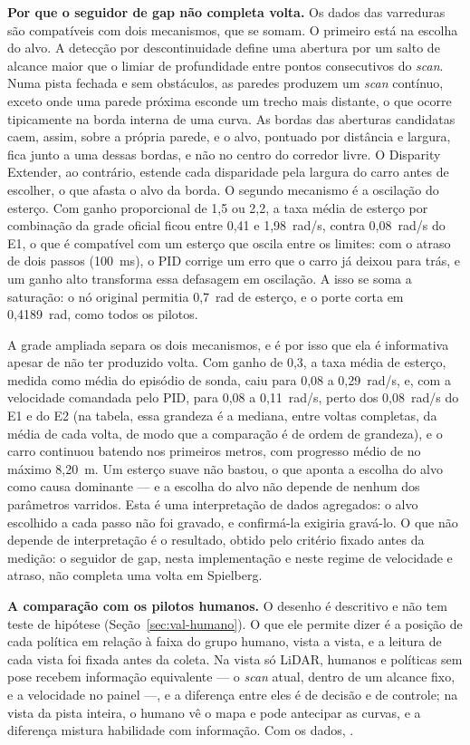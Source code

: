 \textbf{Por que o seguidor de gap não completa volta.} Os dados das varreduras
são compatíveis com dois mecanismos, que se somam. O primeiro está na escolha do
alvo. A detecção por descontinuidade define uma abertura por um salto de alcance
maior que o limiar de profundidade entre pontos consecutivos do \textit{scan}.
Numa pista fechada e sem obstáculos, as paredes produzem um \textit{scan}
contínuo, exceto onde uma parede próxima esconde um trecho mais distante, o que
ocorre tipicamente na borda interna de uma curva. As bordas das aberturas
candidatas caem, assim, sobre a própria parede, e o alvo, pontuado por distância e
largura, fica junto a uma dessas bordas, e não no centro do corredor livre. O
Disparity Extender, ao contrário, estende cada disparidade pela largura do carro
antes de escolher, o que afasta o alvo da borda. O segundo mecanismo é a
oscilação do esterço. Com ganho proporcional de 1,5 ou 2,2, a taxa média de
esterço por combinação da grade oficial ficou entre 0,41 e 1,98~rad/s, contra
0,08~rad/s do E1, o que é compatível com um esterço que oscila entre os limites:
com o atraso de dois passos (100~ms), o PID corrige um erro que o carro já deixou
para trás, e um ganho alto transforma essa defasagem em oscilação. A isso se soma
a saturação: o nó original permitia 0,7~rad de esterço, e o porte corta em
0,4189~rad, como todos os pilotos.

A grade ampliada separa os dois mecanismos, e é por isso que ela é informativa
apesar de não ter produzido volta. Com ganho de 0,3, a taxa média de esterço,
medida como média do episódio de sonda, caiu para 0,08 a 0,29~rad/s, e, com a
velocidade comandada pelo PID, para 0,08 a 0,11~rad/s, perto dos 0,08~rad/s do E1
e do E2 (na tabela, essa grandeza é a mediana, entre voltas completas, da média
de cada volta, de modo que a comparação é de ordem de grandeza), e o carro
continuou batendo
nos primeiros metros, com progresso médio de no máximo 8,20~m. Um esterço suave
não bastou, o que aponta a escolha do alvo como causa dominante --- e a escolha do
alvo não depende de nenhum dos parâmetros varridos. Esta é uma interpretação de
dados agregados: o alvo escolhido a cada passo não foi gravado, e confirmá-la
exigiria gravá-lo. O que não depende de interpretação é o resultado, obtido pelo
critério fixado antes da medição: o seguidor de gap, nesta implementação e neste
regime de velocidade e atraso, não completa uma volta em Spielberg.

\textbf{A comparação com os pilotos humanos.} O desenho é descritivo e não tem
teste de hipótese (Seção~\ref{sec:val-humano}). O que ele permite dizer é a
posição de cada política em relação à faixa do grupo humano, vista a vista, e a
leitura de cada vista foi fixada antes da coleta. Na vista só LiDAR, humanos e
políticas sem pose recebem informação equivalente --- o \textit{scan} atual,
dentro de um alcance fixo, e a velocidade no painel ---, e a diferença entre eles é de
decisão e de controle; na vista da pista inteira, o humano vê o mapa e pode
antecipar as curvas, e a diferença mistura habilidade com informação. Com os
dados, .


